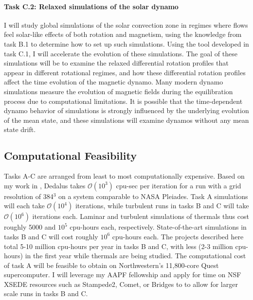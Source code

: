 \documentclass[11pt, preprint]{aastex}
\begin{document}
\paragraph{Task C.2: Relaxed simulations of the solar dynamo}
\label{sct:taskC2}
I will study global simulations of the solar convection zone in regimes where flows feel solar-like effects of both rotation and magnetism, using the knowledge from task B.1 to determine how to set up such simulations.
Using the tool developed in task C.1, I will accelerate the evolution of these simulations.
The goal of these simulations will be to examine the relaxed differential rotation profiles that appear in different rotational regimes, and how these differential rotation profiles affect the time evolution of the magnetic dynamo.
Many modern dynamo simulations measure the evolution of magnetic fields during the equilibration process due to computational limitations.
It is possible that the time-dependent dynamo behavior of simulations is strongly influenced by the underlying evolution of the mean state, and these simulations will examine dynamos without any mean state drift.


\vspace{-0.8cm}
\subsection*{Computational Feasibility}
\vspace{-0.3cm}
\label{sct:feasibility}
Tasks A-C are arranged from least to most computationally expensive.
Based on my work in \citet{anders&brown2017, anders&all2018, anders&all2019}, Dedalus takes $\mathcal{O}(10^3)$ cpu-sec per iteration for a run with a grid resolution of 384$^3$ on a system comparable to NASA Pleiades.
Task A simulations will each take $\mathcal{O}(10^4)$ iterations, while turbulent runs in tasks B and C will take $\mathcal{O}(10^6)$ iterations each.
Laminar and turbulent simulations of thermals thus cost roughly 5000 and $10^5$ cpu-hours each, respectively.
State-of-the-art simulations in tasks B and C will cost roughly $10^6$ cpu-hours each.
The projects described here total 5-10 million cpu-hours per year in tasks B and C, with less (2-3 million cpu-hours) in the first year while thermals are being studied.
The computational cost of task A will be feasible to obtain on Northwestern's 11,800-core Quest supercomputer.
I will leverage my AAPF fellowship and apply for time on NSF XSEDE resources such as Stampede2, Comet, or Bridges to to allow for larger scale runs in tasks B and C. 
\end{document}
